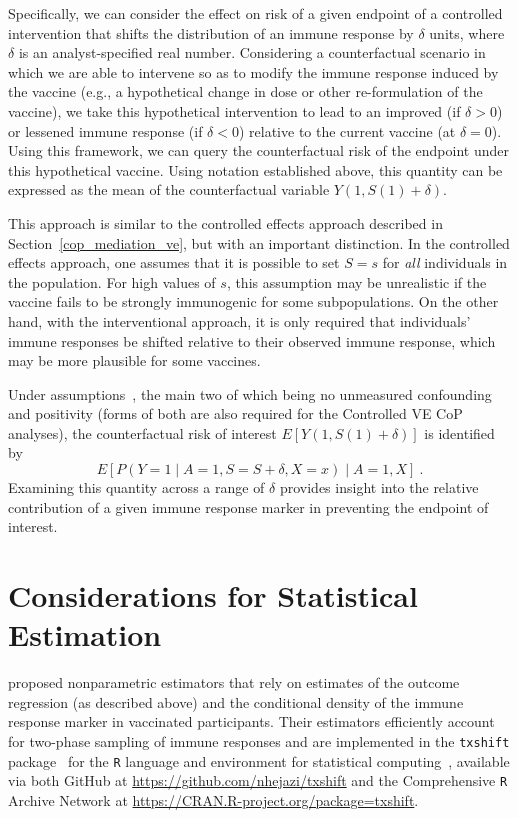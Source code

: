 Specifically, we can consider the
effect on risk of a given endpoint of a controlled intervention that shifts the
distribution of an immune response by $\delta$ units, where $\delta$ is an
analyst-specified real number. Considering a counterfactual scenario in which we
are able to intervene so as to modify the immune response induced by the vaccine
(e.g., a hypothetical change in dose or other re-formulation of the vaccine), we
take this hypothetical intervention to lead to an improved (if $\delta > 0$) or
lessened immune response (if $\delta < 0$) relative to the current vaccine (at
$\delta = 0$). Using this framework, we can query the counterfactual risk of the
endpoint under this hypothetical vaccine. Using notation established above, this
quantity can be expressed as the mean of the counterfactual variable $Y(1, S(1)
+ \delta)$.

This approach is similar to the controlled effects approach described in
Section~\ref{cop_mediation_ve}, but with an important distinction. In the
controlled effects approach, one assumes that it is possible to set $S = s$ for
\textit{all} individuals in the population. For high values of $s$, this
assumption may be unrealistic if the vaccine fails to be strongly immunogenic
for some subpopulations. On the other hand, with the interventional approach, it
is only required that individuals' immune responses be shifted relative to their
observed immune response, which may be more plausible for some vaccines. 

Under assumptions~\citep{hejazi2020efficient}, the main two of which being no
unmeasured confounding and positivity (forms of both are also required for the
Controlled VE CoP analyses), the counterfactual risk of interest 
$E[Y(1, S(1) + \delta)]$ is identified by
\[
  E[P(Y = 1 \mid A = 1, S = S + \delta, X = x) \mid A = 1, X] \ . 
\]
Examining this quantity across a range of $\delta$ provides insight into the
relative contribution of a given immune response marker in preventing the
endpoint of interest. 

\section{Considerations for Statistical Estimation}

\citet{hejazi2020efficient} proposed nonparametric estimators that rely on
estimates of the outcome regression (as described above) and the conditional
density of the immune response marker in vaccinated participants. Their
estimators efficiently account for two-phase sampling of immune responses and
are implemented in the \texttt{txshift} package~\citep{hejazi2020txshift-joss}
for the \texttt{R} language and environment for statistical computing~\citep{R},
available via both GitHub at \url{https://github.com/nhejazi/txshift} and the
Comprehensive \texttt{R} Archive Network at
\url{https://CRAN.R-project.org/package=txshift}.

